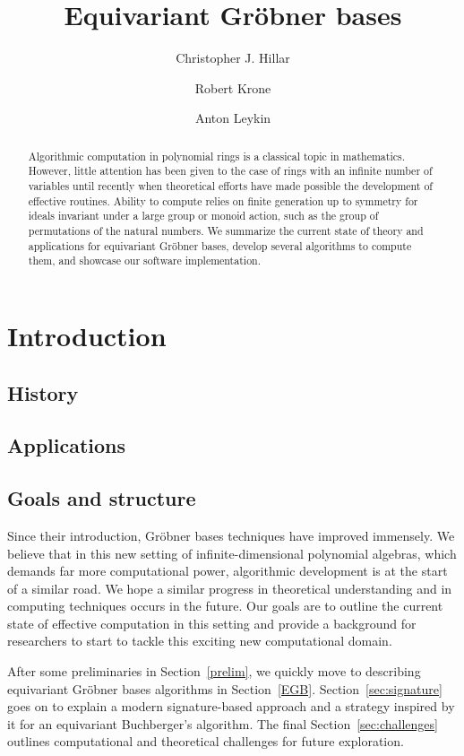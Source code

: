\documentclass[]{aspm}
\title[]{Equivariant Gr\"obner bases}
\author[C.~Hillar]{Christopher J. Hillar}
\author[R.~Krone]{Robert Krone}
\author[A. Leykin]{Anton Leykin}
\begin{document}
\begin{abstract}
 Algorithmic computation in polynomial rings is a classical topic in mathematics. However, little attention has been given to the case of rings with an infinite number of variables until recently when theoretical efforts have made possible the development of effective routines. Ability to compute relies on finite generation up to symmetry for ideals invariant under a large group or monoid action, such as the group of permutations of the natural numbers. We summarize the current state of theory and applications for equivariant Gr\"obner bases, develop several algorithms to compute them, and showcase our software implementation. 
\end{abstract}


\maketitle 
\section{Introduction}
\subsection{History}



\subsection{Applications}



\subsection{Goals and structure}

Since their introduction, Gr\"obner bases techniques have improved immensely.  We believe that in this new setting of infinite-dimensional polynomial algebras, which demands far more computational power, algorithmic development is at the start of a similar road. We hope a similar progress in theoretical understanding and in computing techniques occurs in the future.  Our goals are to outline the current state of effective computation in this setting and provide a background for  researchers to start to tackle this exciting new computational domain.  

After some preliminaries in Section~\ref{prelim}, we quickly move to describing equivariant Gr\"obner bases algorithms in Section~\ref{EGB}.  Section~\ref{sec:signature} goes on to explain a modern signature-based approach and a strategy inspired by it for an equivariant Buchberger's algorithm. The final Section~\ref{sec:challenges} outlines computational and theoretical challenges for future exploration.
\end{document}
